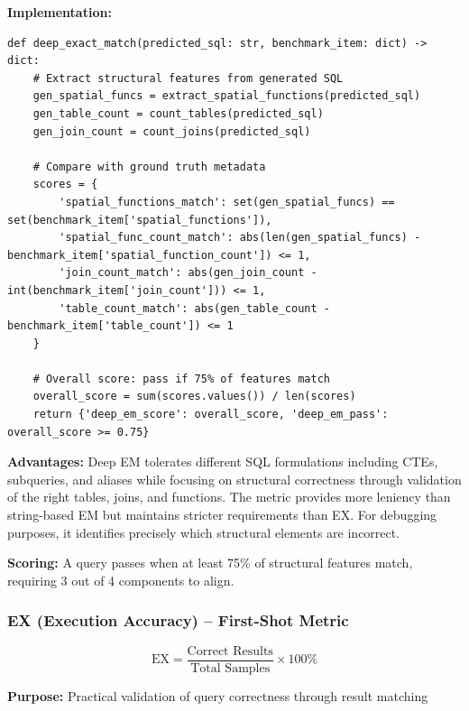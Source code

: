 \textbf{Implementation:}
\begin{lstlisting}[style=pythonstyle]
def deep_exact_match(predicted_sql: str, benchmark_item: dict) -> dict:
    # Extract structural features from generated SQL
    gen_spatial_funcs = extract_spatial_functions(predicted_sql)
    gen_table_count = count_tables(predicted_sql)
    gen_join_count = count_joins(predicted_sql)
    
    # Compare with ground truth metadata
    scores = {
        'spatial_functions_match': set(gen_spatial_funcs) == set(benchmark_item['spatial_functions']),
        'spatial_func_count_match': abs(len(gen_spatial_funcs) - benchmark_item['spatial_function_count']) <= 1,
        'join_count_match': abs(gen_join_count - int(benchmark_item['join_count'])) <= 1,
        'table_count_match': abs(gen_table_count - benchmark_item['table_count']) <= 1
    }
    
    # Overall score: pass if 75% of features match
    overall_score = sum(scores.values()) / len(scores)
    return {'deep_em_score': overall_score, 'deep_em_pass': overall_score >= 0.75}
\end{lstlisting}

\textbf{Advantages:} Deep EM tolerates different SQL formulations including CTEs, subqueries, and aliases while focusing on structural correctness through validation of the right tables, joins, and functions. The metric provides more leniency than string-based EM but maintains stricter requirements than EX. For debugging purposes, it identifies precisely which structural elements are incorrect.

\textbf{Scoring:} A query passes when at least 75\% of structural features match, requiring 3 out of 4 components to align.



\subsubsection{EX (Execution Accuracy) -- First-Shot Metric}

\begin{equation}
\text{EX} = \frac{\text{Correct Results}}{\text{Total Samples}} \times 100\%
\end{equation}

\textbf{Purpose:} Practical validation of query correctness through result matching

